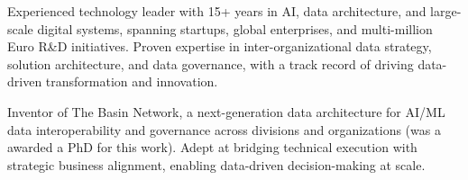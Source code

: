 


\begin{cvparagraph}




%
%
%


Experienced technology leader with 15+ years in AI, data architecture, and large-scale digital systems, spanning startups, global enterprises, and multi-million Euro R\&D initiatives. Proven expertise in inter-organizational data strategy, solution architecture, and data governance, with a track record of driving data-driven transformation and innovation.

Inventor of The Basin Network, a next-generation data architecture for AI/ML data interoperability and governance across divisions and organizations (was a awarded a PhD for this work). Adept at bridging technical execution with strategic business alignment, enabling data-driven decision-making at scale.


\end{cvparagraph}

